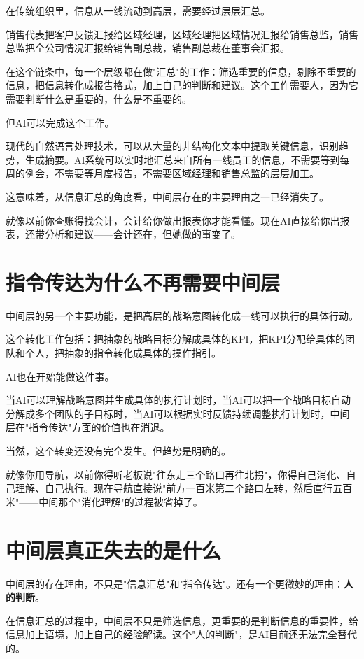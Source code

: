 在传统组织里，信息从一线流动到高层，需要经过层层汇总。

销售代表把客户反馈汇报给区域经理，区域经理把区域情况汇报给销售总监，销售总监把全公司情况汇报给销售副总裁，销售副总裁在董事会汇报。

在这个链条中，每一个层级都在做"汇总"的工作：筛选重要的信息，剔除不重要的信息，把信息转化成报告格式，加上自己的判断和建议。这个工作需要人，因为它需要判断什么是重要的，什么是不重要的。

但AI可以完成这个工作。

现代的自然语言处理技术，可以从大量的非结构化文本中提取关键信息，识别趋势，生成摘要。AI系统可以实时地汇总来自所有一线员工的信息，不需要等到每周的例会，不需要等月度报告，不需要区域经理和销售总监的层层加工。

这意味着，从信息汇总的角度看，中间层存在的主要理由之一已经消失了。

就像以前你查账得找会计，会计给你做出报表你才能看懂。现在AI直接给你出报表，还带分析和建议——会计还在，但她做的事变了。

\section{指令传达为什么不再需要中间层}


中间层的另一个主要功能，是把高层的战略意图转化成一线可以执行的具体行动。

这个转化工作包括：把抽象的战略目标分解成具体的KPI，把KPI分配给具体的团队和个人，把抽象的指令转化成具体的操作指引。

AI也在开始能做这件事。

当AI可以理解战略意图并生成具体的执行计划时，当AI可以把一个战略目标自动分解成多个团队的子目标时，当AI可以根据实时反馈持续调整执行计划时，中间层在"指令传达"方面的价值也在消退。

当然，这个转变还没有完全发生。但趋势是明确的。

就像你用导航，以前你得听老板说"往东走三个路口再往北拐"，你得自己消化、自己理解、自己执行。现在导航直接说"前方一百米第二个路口左转，然后直行五百米"——中间那个"消化理解"的过程被省掉了。

\section{中间层真正失去的是什么}


中间层的存在理由，不只是"信息汇总"和"指令传达"。还有一个更微妙的理由：\textbf{人的判断}。

在信息汇总的过程中，中间层不只是筛选信息，更重要的是判断信息的重要性，给信息加上语境，加上自己的经验解读。这个"人的判断"，是AI目前还无法完全替代的。

